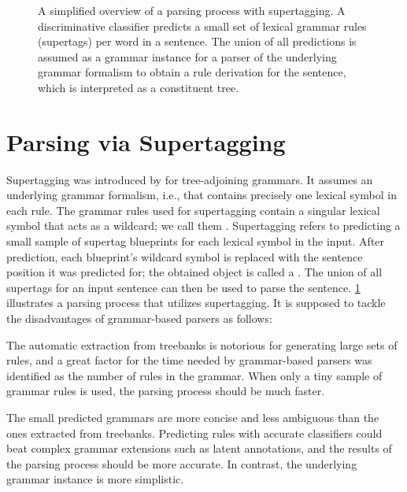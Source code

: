 \documentclass[../document.tex]{subfiles}
\begin{document}
    \begin{figure}
        \resizebox{\linewidth}{!}{}
        \caption{\label{fig:supertagging}
            A simplified overview of a parsing process with supertagging.
            A discriminative classifier predicts a small set of lexical grammar rules (supertags) per word in a sentence.
            The union of all predictions is assumed as a grammar instance for a parser of the underlying grammar formalism to obtain a rule derivation for the sentence, which is interpreted as a constituent tree.
        }
    \end{figure}
    
    \section*{Parsing via Supertagging}
    Supertagging was introduced by \citet{bangalore1999supertagging} for tree-adjoining grammars.
    It assumes an underlying  grammar formalism, i.e.\@, that contains precisely one lexical symbol in each rule.
    The grammar rules used for supertagging contain a singular lexical symbol that acts as a wildcard; we call them .
    Supertagging refers to predicting a small sample of supertag blueprints for each lexical symbol in the input.
    After prediction, each blueprint's wildcard symbol is replaced with the sentence position it was predicted for; the obtained object is called a .
    The union of all supertags for an input sentence can then be used to parse the sentence.
    \cref{fig:supertagging} illustrates a parsing process that utilizes supertagging.
    It is supposed to tackle the disadvantages of grammar-based parsers as follows:
    \begin{compactitem}
        \item The automatic extraction from treebanks is notorious for generating large sets of rules, and a great factor for the time needed by grammar-based parsers was identified as the number of rules in the grammar. \cite{dunlop2010reducing}
            When only a tiny sample of grammar rules is used, the parsing process should be much faster.
        \item The small predicted grammars are more concise and less ambiguous than the ones extracted from treebanks.
            Predicting rules with accurate classifiers could beat complex grammar extensions such as latent annotations, and the results of the parsing process should be more accurate. In contrast, the underlying grammar instance is more simplistic.
    \end{compactitem}
\end{document}

